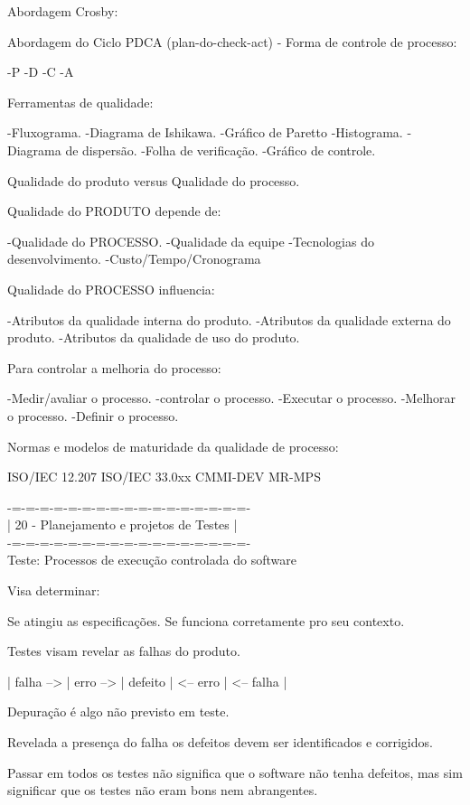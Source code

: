 \documentclass{article}
\begin{document}
	Abordagem Crosby:

	Abordagem do Ciclo PDCA (plan-do-check-act) - Forma de controle de processo:

		-P
		-D
		-C
		-A

Ferramentas de qualidade:

	-Fluxograma.
	-Diagrama de Ishikawa.
	-Gráfico de Paretto
	-Histograma.
	-Diagrama de dispersão.
	-Folha de verificação.
	-Gráfico de controle.

Qualidade do produto versus Qualidade do processo.

	Qualidade do PRODUTO depende de:

		-Qualidade do PROCESSO.
		-Qualidade da equipe
		-Tecnologias do desenvolvimento.
		-Custo/Tempo/Cronograma

	Qualidade do PROCESSO influencia:

		-Atributos da qualidade interna do produto.
		-Atributos da qualidade externa do produto.
		-Atributos da qualidade de uso do produto.

		Para controlar a melhoria do processo:

			-Medir/avaliar o processo.
			-controlar o processo.
			-Executar o processo.
			-Melhorar o processo.
			-Definir o processo.

		Normas e modelos de maturidade da qualidade de processo:

			ISO/IEC 12.207
			ISO/IEC 33.0xx
			CMMI-DEV
			MR-MPS

-=-=-=-=-=-=-=-=-=-=-=-=-=-=-=-=-=-\\
| 20 - Planejamento e projetos de Testes   |\\
-=-=-=-=-=-=-=-=-=-=-=-=-=-=-=-=-=-\\

Teste: Processos de execução controlada do software

	Visa determinar:

		Se atingiu as especificações.
		Se funciona corretamente pro seu contexto.
		
		Testes visam revelar as falhas do produto.

			| falha --> | erro --> | defeito | <-- erro | <-- falha |

		Depuração é algo não previsto em teste.

			Revelada a presença do falha os defeitos devem ser identificados e corrigidos.

		Passar em todos os testes não significa que o software não tenha defeitos, mas sim significar que os testes não eram bons nem abrangentes.
\end{document}
